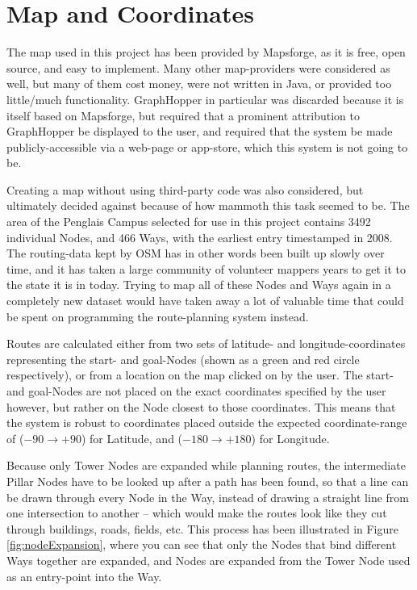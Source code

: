 \section{Map and Coordinates}
The map used in this project has been provided by Mapsforge\cite{Mapsforge,Mapsforge_map-tiles}, as it is free, open source, and easy to implement.
Many other map-providers were considered as well\cite{Graphhopper,mapbox,cloudmade,omniscale,openlayers,GoogleMaps,osrm,geofabrik}, but many of them cost money, were not written in Java, or provided too little/much functionality. GraphHopper\cite{Graphhopper} in particular was discarded because it is itself based on Mapsforge\cite{Mapsforge}, but required that a prominent attribution to GraphHopper be displayed to the user, and required that the system be made publicly-accessible via a web-page or app-store, which this system is not going to be.

Creating a map without using third-party code was also considered, but ultimately decided against because of how mammoth this task seemed to be. The area of the Penglais Campus selected for use in this project contains 3492 individual Nodes, and 466 Ways, with the earliest entry timestamped in 2008. The routing-data kept by OSM has in other words been built up slowly over time, and it has taken a large community of volunteer mappers years to get it to the state it is in today. Trying to map all of these Nodes and Ways again in a completely new dataset would have taken away a lot of valuable time that could be spent on programming the route-planning system instead.

Routes are calculated either from two sets of latitude- and longitude-coordinates representing the start- and goal-Nodes (shown as a green and red circle respectively), or from a location on the map clicked on by the user. The start- and goal-Nodes are not placed on the exact coordinates specified by the user however, but rather on the Node closest to those coordinates. This means that the system is robust to coordinates placed outside the expected coordinate-range of ($-90 \to +90$) for Latitude, and ($-180 \to +180$) for Longitude\cite{WGS84,OSGB,OSM_Convert-WGS84}.

Because only Tower Nodes are expanded while planning routes, the intermediate Pillar Nodes have to be looked up after a path has been found, so that a line can be drawn through every Node in the Way, instead of drawing a straight line from one intersection to another -- which would make the routes look like they cut through buildings, roads, fields, etc. This process has been illustrated in Figure \ref{fig:nodeExpansion}, where you can see that only the Nodes that bind different Ways together are expanded, and Nodes are expanded from the Tower Node used as an entry-point into the Way.


